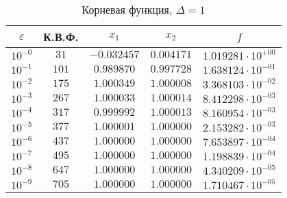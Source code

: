 \documentclass[a4paper,12pt,notitlepage,pdftex,headsepline]{scrartcl}
\begin{document}
        \begin{table}[ht]
          \centering
          \caption{Корневая функция, $\Delta = 1$}
          \begin{tabular}{|c|c|c|c|c|}
            \hline
            $\varepsilon$ & К.В.Ф. & $x_1$ & $x_2$ & $f$\\
            \hline
            $10^{-0}$ & $31$ & $-0.032457$ & $0.004171$ & $1.019281\cdot 10^{+00}$\\
            $10^{-1}$ & $101$ & $0.989870$ & $0.997728$ & $1.638124\cdot 10^{-01}$\\
            $10^{-2}$ & $175$ & $1.000349$ & $1.000008$ & $3.368103\cdot 10^{-02}$\\
            $10^{-3}$ & $267$ & $1.000033$ & $1.000014$ & $8.412298\cdot 10^{-03}$\\
            $10^{-4}$ & $317$ & $0.999992$ & $1.000013$ & $8.160954\cdot 10^{-03}$\\
            $10^{-5}$ & $377$ & $1.000001$ & $1.000000$ & $2.153282\cdot 10^{-03}$\\
            $10^{-6}$ & $437$ & $1.000000$ & $1.000000$ & $7.653897\cdot 10^{-04}$\\
            $10^{-7}$ & $495$ & $1.000000$ & $1.000000$ & $1.198839\cdot 10^{-04}$\\
            $10^{-8}$ & $647$ & $1.000000$ & $1.000000$ & $4.340209\cdot 10^{-05}$\\
            $10^{-9}$ & $705$ & $1.000000$ & $1.000000$ & $1.710467\cdot 10^{-05}$\\
            \hline
          \end{tabular}
        \end{table}
\end{document}
